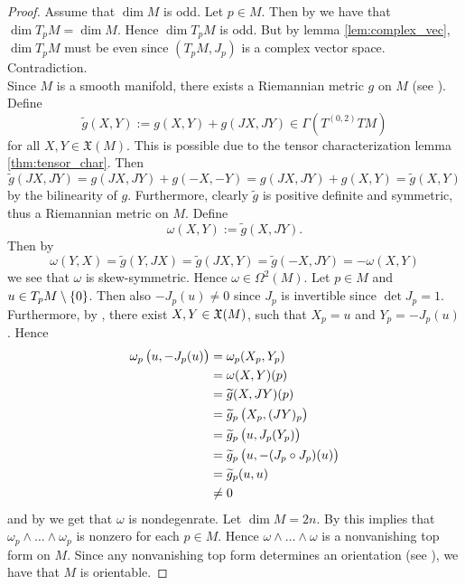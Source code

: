 \begin{proof}
Assume that $\dim M$ is odd. Let $p \in M$. Then by \cite[57]{lee:smooth_manifolds:2013} we have that $\dim T_p M = \dim M$. Hence $\dim T_pM$ is odd. But by lemma \ref{lem:complex_vec}, $\dim T_p M$ must be even since $(T_pM,J_p)$ is a complex vector space. Contradiction.\\
Since $M$ is a smooth manifold, there exists a Riemannian metric $g$ on $M$ (see \cite[329]{lee:smooth_manifolds:2013}). Define 
\begin{equation*}
\widetilde{g}(X,Y) := g(X,Y) + g(JX,JY) \in \Gamma(T^{(0,2)}TM)
\end{equation*}
\noindent for all $X,Y \in \mathfrak{X}(M)$. This is possible due to the tensor characterization lemma \ref{thm:tensor_char}. Then
\begin{equation*}
\widetilde{g}(JX,JY) = g(JX,JY) + g(-X,-Y) = g(JX,JY) + g(X,Y) = \widetilde{g}(X,Y)
\end{equation*}
\noindent by the bilinearity of $g$. Furthermore, clearly $\widetilde{g}$ is positive definite and symmetric, thus a Riemannian metric on $M$. Define
\begin{equation*}
\omega(X,Y) := \widetilde{g}(X,JY).
\end{equation*}
Then by
\begin{equation*}
\omega(Y,X) = \widetilde{g}(Y,JX) = \widetilde{g}(JX,Y) = \widetilde{g}(-X,JY) = -\omega(X,Y)
\end{equation*}
\noindent we see that $\omega$ is skew-symmetric. Hence $\omega \in \Omega^2(M)$. Let $p \in M$ and $u \in T_pM \setminus \cbr{0}$. Then also $-J_p(u) \neq 0$ since $J_p$ is invertible since $\det J_p = 1$. Furthermore, by \cite[177]{lee:smooth_manifolds:2013}, there exist $X,Y \in \mathfrak{X}(M)$, such that $X_p = u$ and $Y_p = -J_p(u)$. Hence
\begin{align*}
\omega_p\del[1]{u,-J_p(u)} &= \omega_p(X_p,Y_p)\\
&= \omega(X,Y)(p)\\
&= \widetilde{g}(X,JY)(p)\\
&= \widetilde{g}_p\del[1]{X_p,(JY)_p}\\
&= \widetilde{g}_p\del[1]{u,J_p(Y_p)}\\
&= \widetilde{g}_p\del[1]{u,-(J_p \circ J_p)(u)}\\
&= \widetilde{g}_p(u,u)\\
&\neq 0
\end{align*}
\noindent and by \cite[565]{lee:smooth_manifolds:2013} we get that $\omega$ is nondegenrate. Let $\dim M = 2n$. By \cite[567]{lee:smooth_manifolds:2013} this implies that $\omega_p \wedge \dots \wedge \omega_p$ is nonzero for each $p \in M$. Hence $\omega \wedge \dots \wedge \omega$ is a nonvanishing top form on $M$. Since any nonvanishing top form determines an orientation (see \cite[381]{lee:smooth_manifolds:2013}), we have that $M$ is orientable.
\end{proof}

